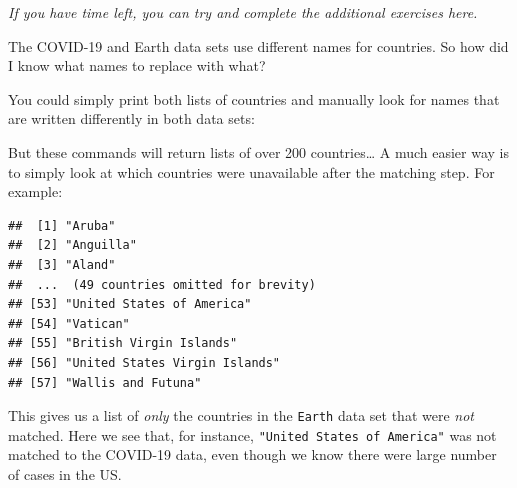 \documentclass[
]{book}
\newenvironment{Shaded}{\begin{snugshade}}{\end{snugshade}}
\newcommand{\CommentTok}[1]{\textcolor[rgb]{0.56,0.35,0.01}{\textit{#1}}}
\newcommand{\FunctionTok}[1]{\textcolor[rgb]{0.00,0.00,0.00}{#1}}
\newcommand{\NormalTok}[1]{#1}
\newcommand{\OtherTok}[1]{\textcolor[rgb]{0.56,0.35,0.01}{#1}}
\newcommand{\SpecialCharTok}[1]{\textcolor[rgb]{0.00,0.00,0.00}{#1}}
\begin{document}
\emph{If you have time left, you can try and complete the additional exercises here.}

The COVID-19 and Earth data sets use different names for countries. So how did I know what names to replace with what?

You could simply print both lists of countries and manually look for names that are written differently in both data sets:

\begin{Shaded}
\end{Shaded}

But these commands will return lists of over 200 countries\ldots{} A much easier way is to simply look at which countries were unavailable after the matching step. For example:

\begin{Shaded}
\end{Shaded}

\begin{verbatim}
##  [1] "Aruba"                                   
##  [2] "Anguilla"                                
##  [3] "Aland"                                   
##  ...  (49 countries omitted for brevity)                              
## [53] "United States of America"                
## [54] "Vatican"                                 
## [55] "British Virgin Islands"                  
## [56] "United States Virgin Islands"            
## [57] "Wallis and Futuna"
\end{verbatim}

This gives us a list of \emph{only} the countries in the \texttt{Earth} data set that were \emph{not} matched. Here we see that, for instance, \texttt{"United\ States\ of\ America"} was not matched to the COVID-19 data, even though we know there were large number of cases in the US.
\end{document}
